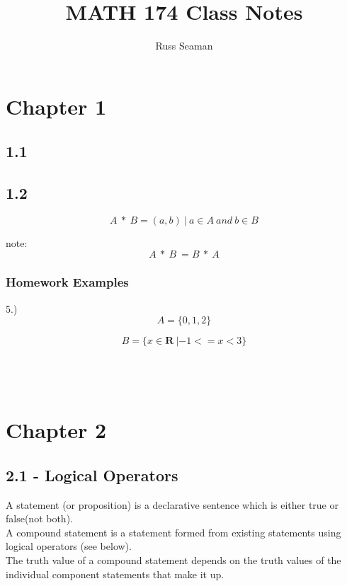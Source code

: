 \documentclass{article}
\title{MATH 174 Class Notes}
\author{Russ Seaman}
\begin{document}
	\maketitle
	\tableofcontents
	\section{Chapter 1}
	\subsection[1.1]{1.1}
	\subsection[1.2]{1.2}

	\[A\ *\ B = {(a,b)\ |\ a \in A\ and\ b \in B}\]
	
	note:
	\[A\ *\ B\ \!= B\ *\ A \]
	\subsubsection{Homework Examples}
	5.)	\[A = \{0,1,2\}	\]
	
		\[B = \{x \in \mathbf{R}\ |-1 <= x< 3 \}\]
	\\
	\\
	\\
	
	\section{Chapter 2}
	\subsection[2.1 - Logical Operators]{2.1 - Logical Operators}
	A statement (or proposition) is a declarative sentence which is either true or false(not both).
	\\
	\bigskip
	A compound statement is a statement formed from existing statements using logical operators (see below).
	\\
	\bigskip
	The truth value of a compound statement depends on the truth values of the individual component statements that make it up.
	
\end{document}
